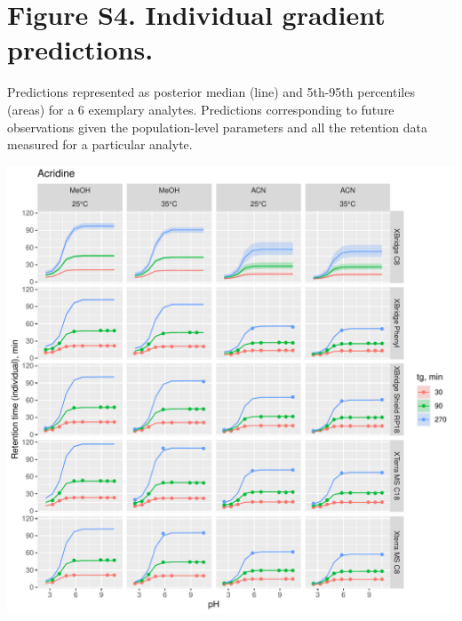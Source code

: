\documentclass[
]{article}
\begin{document}
\newpage{}

\hypertarget{figure-s4.-individual-gradient-predictions.}{%
\section{Figure S4. Individual gradient
predictions.}\label{figure-s4.-individual-gradient-predictions.}}

Predictions represented as posterior median (line) and 5th-95th
percentiles (areas) for a 6 exemplary analytes. Predictions
corresponding to future observations given the population-level
parameters and all the retention data measured for a particular analyte.

\includegraphics{../figures/concordanceplots/Acridine.individual.pdf}

\newpage{}
\end{document}
